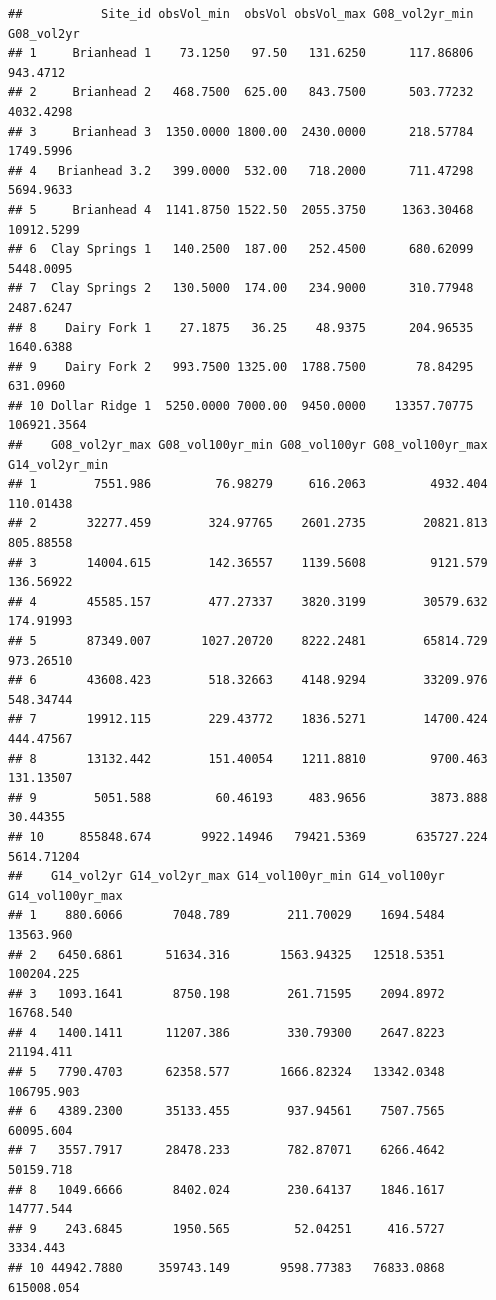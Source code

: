 \documentclass[
]{book}
\begin{document}
\begin{verbatim}
##           Site_id obsVol_min  obsVol obsVol_max G08_vol2yr_min  G08_vol2yr
## 1     Brianhead 1    73.1250   97.50   131.6250      117.86806    943.4712
## 2     Brianhead 2   468.7500  625.00   843.7500      503.77232   4032.4298
## 3     Brianhead 3  1350.0000 1800.00  2430.0000      218.57784   1749.5996
## 4   Brianhead 3.2   399.0000  532.00   718.2000      711.47298   5694.9633
## 5     Brianhead 4  1141.8750 1522.50  2055.3750     1363.30468  10912.5299
## 6  Clay Springs 1   140.2500  187.00   252.4500      680.62099   5448.0095
## 7  Clay Springs 2   130.5000  174.00   234.9000      310.77948   2487.6247
## 8    Dairy Fork 1    27.1875   36.25    48.9375      204.96535   1640.6388
## 9    Dairy Fork 2   993.7500 1325.00  1788.7500       78.84295    631.0960
## 10 Dollar Ridge 1  5250.0000 7000.00  9450.0000    13357.70775 106921.3564
##    G08_vol2yr_max G08_vol100yr_min G08_vol100yr G08_vol100yr_max G14_vol2yr_min
## 1        7551.986         76.98279     616.2063         4932.404      110.01438
## 2       32277.459        324.97765    2601.2735        20821.813      805.88558
## 3       14004.615        142.36557    1139.5608         9121.579      136.56922
## 4       45585.157        477.27337    3820.3199        30579.632      174.91993
## 5       87349.007       1027.20720    8222.2481        65814.729      973.26510
## 6       43608.423        518.32663    4148.9294        33209.976      548.34744
## 7       19912.115        229.43772    1836.5271        14700.424      444.47567
## 8       13132.442        151.40054    1211.8810         9700.463      131.13507
## 9        5051.588         60.46193     483.9656         3873.888       30.44355
## 10     855848.674       9922.14946   79421.5369       635727.224     5614.71204
##    G14_vol2yr G14_vol2yr_max G14_vol100yr_min G14_vol100yr G14_vol100yr_max
## 1    880.6066       7048.789        211.70029    1694.5484        13563.960
## 2   6450.6861      51634.316       1563.94325   12518.5351       100204.225
## 3   1093.1641       8750.198        261.71595    2094.8972        16768.540
## 4   1400.1411      11207.386        330.79300    2647.8223        21194.411
## 5   7790.4703      62358.577       1666.82324   13342.0348       106795.903
## 6   4389.2300      35133.455        937.94561    7507.7565        60095.604
## 7   3557.7917      28478.233        782.87071    6266.4642        50159.718
## 8   1049.6666       8402.024        230.64137    1846.1617        14777.544
## 9    243.6845       1950.565         52.04251     416.5727         3334.443
## 10 44942.7880     359743.149       9598.77383   76833.0868       615008.054
\end{verbatim}
\end{document}
